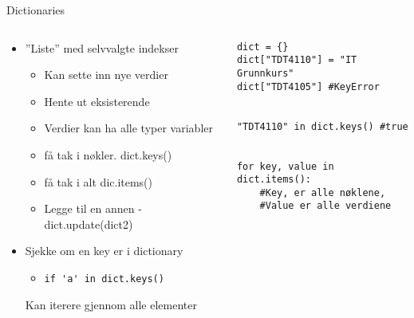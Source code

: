 \documentclass[screen, aspectratio=169]{beamer}
\begin{document}
\begin{frame}[fragile]{Dictionaries}
	\begin{columns}
		\begin{column}{.5\textwidth}
			\begin{itemize}
				\item ''Liste'' med selvvalgte indekser
				\begin{itemize}
					\item Kan sette inn nye verdier
					\item Hente ut eksisterende
					\item Verdier kan ha alle typer variabler
					\item få tak i nøkler. dict.keys()
					\item få tak i alt dic.items() 
					\item Legge til en annen - dict.update(dict2)
				\end{itemize}
				\item Sjekke om en key er i dictionary
				\begin{itemize}
				    \item \lstinline|if 'a' in dict.keys()|
				    
				\end{itemize}
				Kan iterere gjennom alle elementer
			
			\end{itemize}
		\end{column}
		\begin{column}{.5\textwidth}
			\begin{lstlisting}
dict = {}
dict["TDT4110"] = "IT Grunnkurs"
dict["TDT4105"] #KeyError


"TDT4110" in dict.keys() #true


for key, value in dict.items(): 
    #Key, er alle nøklene, 
    #Value er alle verdiene

			\end{lstlisting}
		\end{column}
	\end{columns}
\end{frame}
\end{document}
